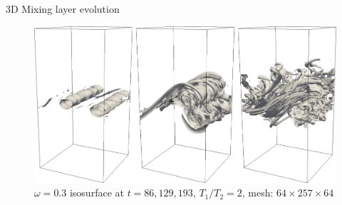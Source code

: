 \documentclass[presentation]{beamer}
\begin{document}
\begin{frame}[label=sec-5]{3D Mixing layer evolution}
\begin{figure}[htb]
\centering
\includegraphics[width=0.9\linewidth]{./figures/r2-t86-129-193-w03.png}
\caption{$\omega=0.3$ isosurface at $t=86,129,193$, $T_1 / T_2 = 2$, mesh: $64\times257\times64$}
\end{figure}
\end{frame}
\end{document}
